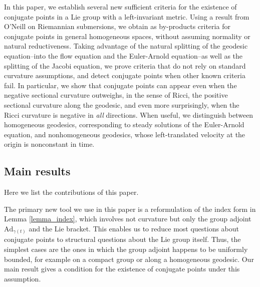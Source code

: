 \documentclass[oneside, 11pt]{amsart}
\numberwithin{equation}{section}
\newcommand{\Ad}{\mathrm{Ad}}
\begin{document}
In this paper, we establish several new sufficient criteria for the existence of conjugate points in a Lie group with a left-invariant metric. Using a result from O'Neill on Riemannian submersions, we obtain as by-products criteria for conjugate points in general homogeneous spaces, without assuming normality or natural reductiveness. Taking advantage of the natural splitting of the geodesic equation--into the flow equation and the Euler-Arnold equation--as well as the splitting of the Jacobi equation, we prove criteria that do not rely on standard curvature assumptions, and detect conjugate points when other known criteria fail. In particular, we show that conjugate points can appear even when the negative sectional curvature outweighs, in the sense of Ricci, the positive sectional curvature along the geodesic, and even more surprisingly, when the Ricci curvature is negative in \emph{all} directions. When useful, we distinguish between homogeneous geodesics, corresponding to steady solutions of the Euler-Arnold equation, and nonhomogeneous geodesics, whose left-translated velocity at the origin is nonconstant in time.


\subsection{Main results}
Here we list the contributions of this paper. 

The primary new tool we use in this paper is a reformulation of the index form in Lemma \ref{lemma_index}, which involves not curvature but only the group adjoint $\Ad_{\gamma(t)}$ and the Lie bracket. This enables us to reduce most questions about conjugate points to structural questions about the Lie group itself. Thus, the simplest cases are the ones in which the group adjoint happens to be uniformly bounded, for example on a compact group or along a homogeneous geodesic. Our main result gives a condition for the existence of conjugate points under this assumption.  
\end{document}
